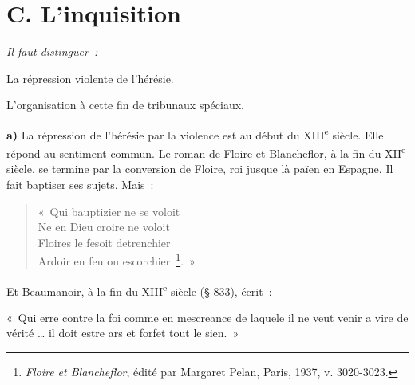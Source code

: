 \documentclass[french,twoside]{book} %
\newlength{\listmod}
\newcommand{\listhead}[1]{\hspace{-1\listmod}\emph{#1}}
\newcommand{\labelchar}[1]{\textbf{\color{rubric} #1}}
\newenvironment{quoteblock}%
  {\begin{quoting}}
  {\end{quoting}}
\newenvironment{quotebar}{%
    \def\FrameCommand{{\color{rubric!10!}\vrule width 0.5em} \hspace{0.9em}}%
    \def\OuterFrameSep{\itemsep} %
    \MakeFramed {\advance\hsize-\width \FrameRestore}
  }%
  {%
    \endMakeFramed
  }
\renewenvironment{quoteblock}%
  {%
    \savenotes
    \setstretch{0.9}
    \normalfont
    \begin{quotebar}
  }
  {%
    \end{quotebar}
    \spewnotes
  }
\begin{document}
\section[{C. L’inquisition}]{C. L’inquisition}
\label{c10c}

\begin{listalpha}[itemsep=0pt,]
\item[]\listhead{Il faut distinguer :}
\item La répression violente de l’hérésie.
\item L’organisation à cette fin de tribunaux spéciaux.
\end{listalpha}

\noindent \labelchar{a)} La répression de l’hérésie par la violence est au début du XIII\textsuperscript{e} siècle. Elle répond au sentiment commun. Le roman de Floire et Blancheflor, à la fin du XII\textsuperscript{e} siècle, se termine par la conversion de Floire, roi jusque là païen en Espagne. Il fait baptiser ses sujets. Mais :\par


\begin{verse}
« Qui bauptizier ne se voloit\\
Ne en Dieu croire ne voloit\\
Floires le fesoit detrenchier\\
Ardoir en feu ou escorchier \footnote{{\itshape Floire et Blancheflor}, édité par Margaret Pelan, Paris, 1937, v. 3020-3023.}. »\\
\end{verse}

\noindent Et Beaumanoir, à la fin du XIII\textsuperscript{e} siècle (§ 833), écrit :\par

\begin{quoteblock}
\noindent « Qui erre contre la foi comme en mescreance de laquele il ne veut venir a vire de vérité … il doit estre ars et forfet tout le sien. »\end{quoteblock}
\end{document}
